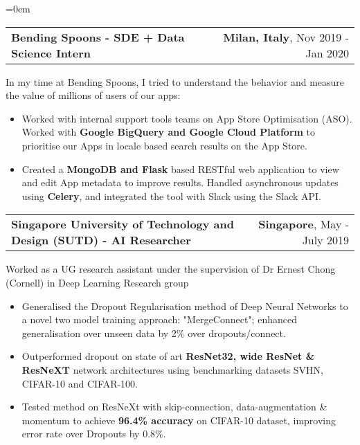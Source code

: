 \documentclass{article}
\makeatletter
\newcommand{\headerrow}[2]
{\begin{tabular*}{\linewidth}{l@{\extracolsep{\fill}}r}
	#1 &
	#2 \\
\end{tabular*}}
\makeatother
\begin{document}
\begin{list} {}{\leftmargin=0em}
     \item[]
    \headerrow {\textbf{Bending Spoons - SDE + Data Science Intern}}{\textbf{Milan, Italy},  Nov 2019 - Jan 2020}
    In my time at Bending Spoons, I tried to understand the behavior and measure the value of millions of users of our apps:
    \begin{itemize}
    \setlength\itemsep{0.0em}
        \item Worked with internal support tools teams on App Store Optimisation (ASO). Worked with \textbf{Google BigQuery and Google Cloud Platform} to prioritise our Apps in locale based search results on the App Store.
        \item Created a \textbf{MongoDB and Flask} based RESTful web application to view and edit App metadata to improve results. Handled asynchronous updates using \textbf{Celery}, and integrated the tool with Slack using the Slack API.
    \end{itemize}
    
    \item[]
    \headerrow {\textbf{Singapore University of Technology and Design (SUTD) - AI Researcher }}{\textbf{Singapore}, May - July 2019}
    Worked as a UG research assistant under the supervision of Dr Ernest Chong (Cornell) in Deep Learning Research group
    \begin{itemize}
    \setlength\itemsep{0.0em}
        \item Generalised the Dropout Regularisation method of Deep Neural Networks to a novel two model training approach: "MergeConnect"; enhanced generalisation over unseen data by 2\% over dropouts/connect.
        \item Outperformed dropout on state of art \textbf{ResNet32, wide ResNet \& ResNeXT} network architectures using benchmarking datasets SVHN, CIFAR-10 and CIFAR-100.
        \item Tested method on ResNeXt with skip-connection, data-augmentation \& momentum to achieve \textbf{96.4\% accuracy} on CIFAR-10 dataset, improving error rate over Dropouts by 0.8\%.
    \end{itemize}
    

\end{list}
\end{document}
